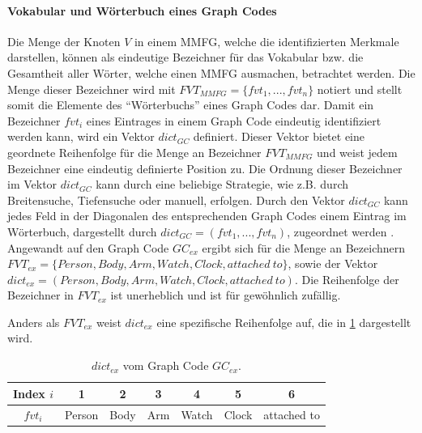 \paragraph{Vokabular und Wörterbuch eines Graph Codes}
\label{sec2:sota:par:gc-vocabulary-dictionary}
Die Menge der Knoten $V$ in einem MMFG, welche die identifizierten Merkmale darstellen, können als eindeutige Bezeichner für das Vokabular bzw. die Gesamtheit aller Wörter, welche einen MMFG ausmachen, betrachtet werden.
Die Menge dieser Bezeichner wird mit $FVT_{MMFG}=\{fvt_1,...,fvt_n\}$ notiert und stellt somit die Elemente des \enquote{Wörterbuchs} eines Graph Codes dar.
Damit ein Bezeichner $fvt_i$ eines Eintrages in einem Graph Code eindeutig identifiziert werden kann, wird ein Vektor $dict_{GC}$ definiert.
Dieser Vektor bietet eine geordnete Reihenfolge für die Menge an Bezeichner $FVT_{MMFG}$ und weist jedem Bezeichner eine eindeutig definierte Position zu.
Die Ordnung dieser Bezeichner im Vektor $dict_{GC}$ kann durch eine beliebige Strategie, wie z.B. durch Breitensuche, Tiefensuche oder manuell, erfolgen.
Durch den Vektor $dict_{GC}$ kann jedes Feld in der Diagonalen des entsprechenden Graph Codes einem Eintrag im Wörterbuch, dargestellt durch $dict_{GC} = (fvt_1,...,fvt_n)$, zugeordnet werden \cite{gc-2d-proj-mmfg}.
Angewandt auf den Graph Code $GC_{ex}$ ergibt sich für die Menge an Bezeichnern $FVT_{ex}=\{Person,Body,Arm,Watch,Clock,attached~to\}$, sowie der Vektor $dict_{ex}=(Person,Body,Arm,Watch,Clock,attached~to)$.
Die Reihenfolge der Bezeichner in $FVT_{ex}$ ist unerheblich und ist für gewöhnlich zufällig.

Anders als $FVT_{ex}$ weist $dict_{ex}$ eine spezifische Reihenfolge auf, die in \cref{sec2:sota:par:gc-vocabulary-dictionary:tab:dict-ex} dargestellt wird.

\begin{table}[htb]
    \centering
    \begin{tabular}{c|c|c|c|c|c|c}
         Index $i$ & 1 & 2 & 3 & 4 & 5 & 6 \\ \hline
         $fvt_i$ & Person & Body & Arm & Watch & Clock & attached to 
    \end{tabular}
    \caption{$dict_{ex}$ vom Graph Code $GC_{ex}$.}
    \label{sec2:sota:par:gc-vocabulary-dictionary:tab:dict-ex}
\end{table}

